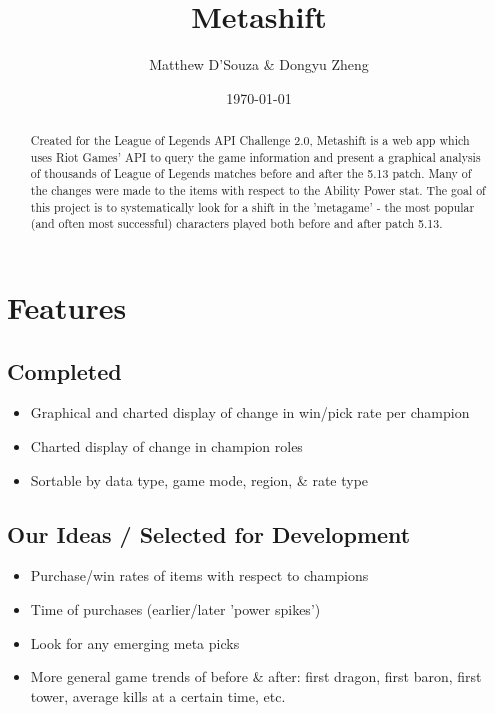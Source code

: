 \documentclass{article}
\title{Metashift}
\date{\today}
\author{Matthew D'Souza \& Dongyu Zheng}
\begin{document}
\maketitle
{}

\newpage
\begin{abstract}
    Created for the League of Legends API Challenge 2.0, Metashift is a web app which uses Riot Games' API to query the game information and present a graphical analysis of thousands of League of Legends matches before and after the 5.13 patch. Many of the changes were made to the items with respect to the Ability Power stat. The goal of this project is to systematically look for a shift in the 'metagame' - the most popular (and often most successful) characters played both before and after patch 5.13.
\end{abstract}

\newpage
\tableofcontents

\newpage
{}



\section{Features}

\subsection{Completed}
\begin{itemize}
    \item Graphical and charted display of change in win/pick rate per champion
    \item Charted display of change in champion roles 
    \item Sortable by data type, game mode, region, \& rate type
\end{itemize}

\subsection{Our Ideas / Selected for Development}
\begin{itemize}
    \item Purchase/win rates of items with respect to champions
    \item Time of purchases (earlier/later 'power spikes')
    \item Look for any emerging meta picks
    \item More general game trends of before \& after: first dragon, first baron, first tower, average kills at a certain time, etc.
\end{itemize}
\end{document}

